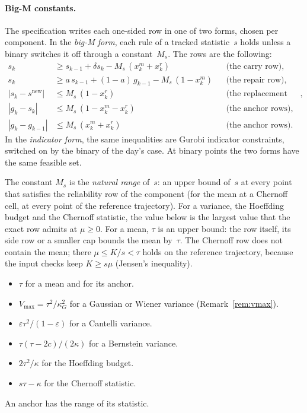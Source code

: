 \documentclass[11pt,a4paper]{article}
\theoremstyle{plain}
\theoremstyle{definition}
\theoremstyle{remark}
\begin{document}
\paragraph{Big-M constants.}\label{sec:impl_encoding}
The specification writes each one-sided row in one of two forms, chosen per component.
In the \emph{big-M form}, each rule of a tracked statistic~$s$ holds unless a binary switches it off through a constant~$M_s$.
The rows are the following:
\begin{align}
  s_k &\ge s_{k-1} + \delta s_k - M_s\,(x^m_k + x^r_k) && \text{(the carry row)}, \\
  s_k &\ge a\,s_{k-1} + (1-a)\,g_{k-1} - M_s\,(1 - x^m_k) && \text{(the repair row)}, \\
  |s_k - s^{\mathrm{new}}| &\le M_s\,(1 - x^r_k) && \text{(the replacement rows)}, \\
  |g_k - s_k| &\le M_s\,(1 - x^m_k - x^r_k) && \text{(the anchor rows)}, \\
  |g_k - g_{k-1}| &\le M_s\,(x^m_k + x^r_k) && \text{(the anchor rows)}.
\end{align}
In the \emph{indicator form}, the same inequalities are Gurobi indicator constraints, switched on by the binary of the day's case.
At binary points the two forms have the same feasible set.

The constant $M_s$ is the \emph{natural range} of~$s$: an upper bound of~$s$ at every point that satisfies the reliability row of the component (for the mean at a Chernoff cell, at every point of the reference trajectory).
For a variance, the Hoeffding budget and the Chernoff statistic, the value below is the largest value that the exact row admits at $\mu \ge 0$.
For a mean, $\tau$ is an upper bound: the row itself, its side row or a smaller cap bounds the mean by~$\tau$.
The Chernoff row does not contain the mean; there $\mu \le K/s < \tau$ holds on the reference trajectory, because the input checks keep $K \ge s\mu$ (Jensen's inequality).
\begin{itemize}
  \item $\tau$ for a mean and for its anchor.
  \item $V_{\max} = \tau^2/\kappa_G^2$ for a Gaussian or Wiener variance (Remark~\ref{rem:vmax}).
  \item $\varepsilon\tau^2/(1-\varepsilon)$ for a Cantelli variance.
  \item $\tau(\tau - 2c)/(2\kappa)$ for a Bernstein variance.
  \item $2\tau^2/\kappa$ for the Hoeffding budget.
  \item $s\tau - \kappa$ for the Chernoff statistic.
\end{itemize}
An anchor has the range of its statistic.
\end{document}
